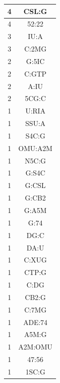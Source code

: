 \begin{center}
\begin{longtable}{c|c}
      4 & CSL:G    \\ \hline
      4 & 52:22    \\ \hline
      3 & IU:A     \\ \hline
      3 & C:2MG    \\ \hline
      2 & G:5IC    \\ \hline
      2 & C:GTP    \\ \hline
      2 & A:IU     \\ \hline
      2 & 5CG:C    \\ \hline
      1 & U:RIA    \\ \hline
      1 & SSU:A    \\ \hline
      1 & S4C:G    \\ \hline
      1 & OMU:A2M  \\ \hline
      1 & N5C:G    \\ \hline
      1 & G:S4C    \\ \hline
      1 & G:CSL    \\ \hline
      1 & G:CB2    \\ \hline
      1 & G:A5M    \\ \hline
      1 & G:74     \\ \hline
      1 & DG:C     \\ \hline
      1 & DA:U     \\ \hline
      1 & C:XUG    \\ \hline
      1 & CTP:G    \\ \hline
      1 & C:DG     \\ \hline
      1 & CB2:G    \\ \hline
      1 & C:7MG    \\ \hline
      1 & ADE:74   \\ \hline
      1 & A5M:G    \\ \hline
      1 & A2M:OMU  \\ \hline
      1 & 47:56    \\ \hline
      1 & 1SC:G    \\ \hline 
\end{longtable}
\end{center}

